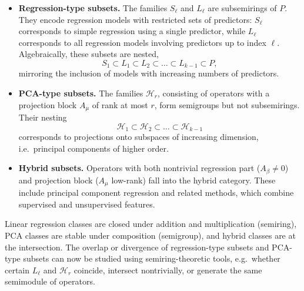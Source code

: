 \begin{itemize}
  \item \textbf{Regression-type subsets.}  
  The families $S_\ell$ and $L_\ell$ are subsemirings of $P$. They encode regression models with restricted sets of predictors: $S_\ell$ corresponds to simple regression using a single predictor, while $L_\ell$ corresponds to all regression models involving predictors up to index $\ell$. Algebraically, these subsets are nested,
  \[
  S_1 \subset L_1 \subset L_2 \subset \dots \subset L_{k-1} \subset P,
  \]
  mirroring the inclusion of models with increasing numbers of predictors.

  \item \textbf{PCA-type subsets.}  
  The families $\mathcal{H}_r$, consisting of operators with a projection block $A_\mu$ of rank at most $r$, form semigroups but not subsemirings. Their nesting
  \[
  \mathcal{H}_1 \subset \mathcal{H}_2 \subset \dots \subset \mathcal{H}_{k-1}
  \]
  corresponds to projections onto subspaces of increasing dimension, i.e.\ principal components of higher order.

  \item \textbf{Hybrid subsets.}  
  Operators with both nontrivial regression part ($A_\beta\neq 0$) and projection block ($A_\mu$ low-rank) fall into the hybrid category. These include principal component regression and related methods, which combine supervised and unsupervised features.
\end{itemize}

Linear regression classes are closed under addition and multiplication (semiring), PCA classes are stable under composition (semigroup), and hybrid classes are at the intersection. The overlap or divergence of regression-type subsets and PCA-type subsets can now be studied using semiring-theoretic tools, e.g.\ whether certain \(L_\ell\) and \(\mathcal{H}_r\) coincide, intersect nontrivially, or generate the same semimodule of operators.
